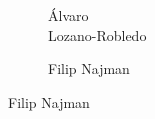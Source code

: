 \begin{frame}[plain]
\begin{figure}[h]
\begin{subfigure}{0.20\textwidth}
	\caption{\tiny \hspace{0.7cm}\'Alvaro \\ \;\;\;\;\;Lozano-Robledo}
	\end{subfigure} \quad
	\begin{subfigure}{0.20\textwidth}
	\captionsetup{labelformat=empty}
	\centering
	\caption{\tiny Filip Najman}
	\end{subfigure}
	\end{figure}
\end{frame}





